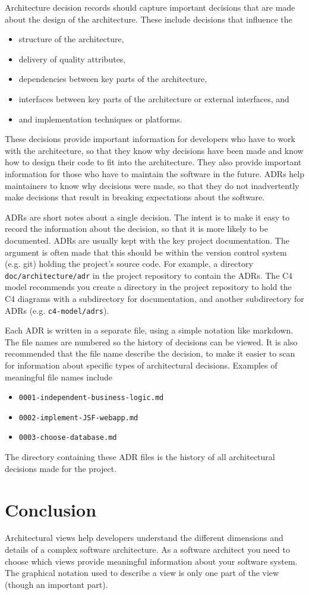 Architecture decision records should capture important decisions that are made about the design of the architecture.
These include decisions that influence the 
\begin{itemize}[noitemsep,nolistsep]
    \item structure of the architecture,
    \item delivery of quality attributes,
    \item dependencies between key parts of the architecture,
    \item interfaces between key parts of the architecture or external interfaces, and
    \item and implementation techniques or platforms.
\end{itemize}
These decisions provide important information for developers who have to work with the architecture,
so that they know why decisions have been made and know how to design their code to fit into the architecture.
They also provide important information for those who have to maintain the software in the future.
ADRs help maintainers to know why decisions were made,
so that they do not inadvertently make decisions that result in breaking expectations about the software.

ADRs are short notes about a single decision.
The intent is to make it easy to record the information about the decision, so that it is more likely to be documented.
ADRs are usually kept with the key project documentation.
The argument is often made that this should be within the version control system (e.g. git) holding the project's source code.
For example, a directory \texttt{doc/architecture/adr} in the project repository to contain the ADRs.
The C4 model recommends you create a directory in the project repository to hold the C4 diagrams
with a subdirectory for documentation, and another subdirectory for ADRs
(e.g. \texttt{c4-model/adrs}).

Each ADR is written in a separate file, using a simple notation like markdown.
The file names are numbered so the history of decisions can be viewed.
It is also recommended that the file name describe the decision,
to make it easier to scan for information about specific types of architectural decisions.
Examples of meaningful file names include
\begin{itemize}[noitemsep,nolistsep]
    \item \texttt{0001-independent-business-logic.md}
    \item \texttt{0002-implement-JSF-webapp.md}
    \item \texttt{0003-choose-database.md}
\end{itemize}
The directory containing these ADR files is the history of all architectural decisions made for the project.


\section{Conclusion}
Architectural views help developers understand the different dimensions and details of a complex software architecture.
As a software architect you need to choose which views provide meaningful information about your software system.
The graphical notation used to describe a view is only one part of the view (though an important part).
